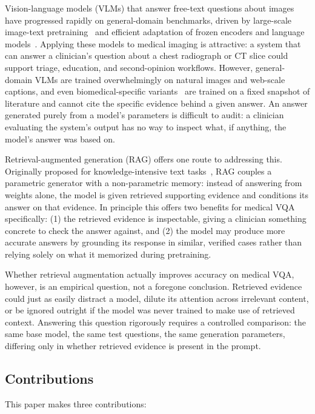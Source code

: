 Vision-language models (VLMs) that answer free-text questions about images
have progressed rapidly on general-domain benchmarks, driven by large-scale
image-text pretraining~\cite{radford2021clip} and efficient adaptation of
frozen encoders and language models~\cite{li2023blip2}. Applying these
models to medical imaging is attractive: a system that can answer a
clinician's question about a chest radiograph or CT slice could support
triage, education, and second-opinion workflows. However, general-domain
VLMs are trained overwhelmingly on natural images and web-scale captions,
and even biomedical-specific variants~\cite{li2023llavamed} are trained on
a fixed snapshot of literature and cannot cite the specific evidence behind
a given answer. An answer generated purely from a model's parameters is
difficult to audit: a clinician evaluating the system's output has no way
to inspect what, if anything, the model's answer was based on.

Retrieval-augmented generation (RAG) offers one route to addressing this.
Originally proposed for knowledge-intensive text tasks~\cite{lewis2020rag},
RAG couples a parametric generator with a non-parametric memory: instead of
answering from weights alone, the model is given retrieved supporting
evidence and conditions its answer on that evidence. In principle this
offers two benefits for medical VQA specifically: (1) the retrieved
evidence is inspectable, giving a clinician something concrete to check the
answer against, and (2) the model may produce more accurate answers by
grounding its response in similar, verified cases rather than relying
solely on what it memorized during pretraining.

Whether retrieval augmentation actually improves accuracy on medical VQA,
however, is an empirical question, not a foregone conclusion. Retrieved
evidence could just as easily distract a model, dilute its attention across
irrelevant content, or be ignored outright if the model was never trained
to make use of retrieved context. Answering this question rigorously
requires a controlled comparison: the same base model, the same test
questions, the same generation parameters, differing only in whether
retrieved evidence is present in the prompt.

\subsection{Contributions}

This paper makes three contributions:

